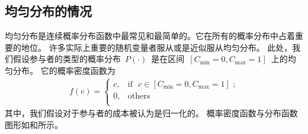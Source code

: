 \subsection{均匀分布的情况}
均匀分布是连续概率分布函数中最常见和最简单的。它在所有的概率分布中占着重要的地位。
许多实际上重要的随机变量者服从或是近似服从均匀分布。
此处，我们假设参与者的类型的概率分布~$P(\cdot)$~是在区间~$[C_{\min}=0, C_{\max}=1]$~上的均匀分布。
它的概率密度函数为
\begin{align}
    f(c) = \begin{cases} c, &\text{if ~$c \in [C_{\min}=0, C_{\max}=1]$~;}\\
        0, &\text{others}\\ 
    \end{cases} 
    \label{eqn_equilibrium_prob} 
\end{align}
其中，我们假设对于参与者的成本被认为是归一化的。
概率密度函数与分布函数图形如和所示。
